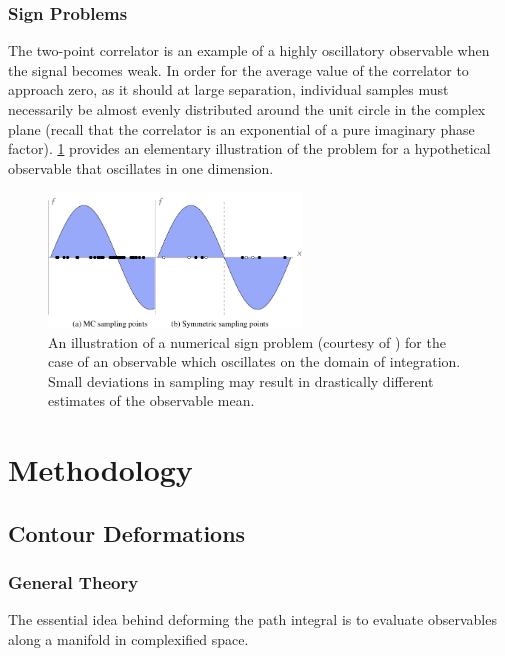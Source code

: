 \documentclass[12pt]{article}
\begin{document}
\subsubsection{Sign Problems}

The two-point correlator is an example of a highly oscillatory observable when the signal becomes weak. In order for the average value of the correlator to approach zero, 
as it should at large separation, individual samples must necessarily be almost evenly distributed around the unit circle in the complex plane (recall that the correlator 
is an exponential of a pure imaginary phase factor). \ref{fig:sign_problem} provides an elementary illustration of the problem for a hypothetical observable that oscillates 
in one dimension.

\begin{figure}[h]
	\centering
	\includegraphics[width=0.6\textwidth]{figures/sign.png}
	\caption[Sign Problem Illustration]{An illustration of a numerical sign problem (courtesy of \cite{10.1007/978-3-030-43465-6_11}) for the case of an observable
	which oscillates on the domain of integration. Small deviations in sampling may result in drastically different estimates
	of the observable mean.}
	\label{fig:sign_problem}
\end{figure}

\section{Methodology}

\subsection{Contour Deformations}

\subsubsection{General Theory}

The essential idea behind deforming the path integral is to evaluate observables along a manifold in complexified space. 
\end{document}
